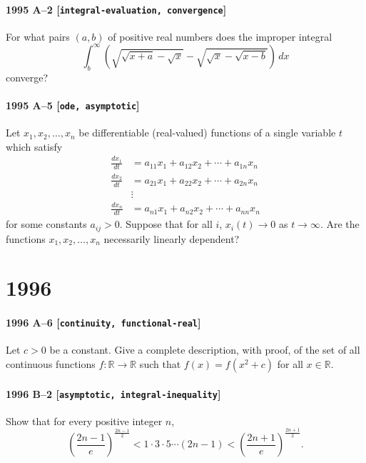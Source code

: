 \documentclass[11pt]{article}
\begin{document}
\paragraph{1995 A--2 \textnormal{[\texttt{integral-evaluation, convergence}]}}
For what pairs $(a,b)$ of positive real numbers does the
improper integral
\[
\int_{b}^{\infty} \left( \sqrt{\sqrt{x+a}-\sqrt{x}} -
\sqrt{\sqrt{x}-\sqrt{x-b}} \right)\,dx
\]
converge?

\paragraph{1995 A--5 \textnormal{[\texttt{ode, asymptotic}]}}
Let $x_{1},x_{2},\dots,x_{n}$ be differentiable
(real-valued) functions of a single variable $t$ which satisfy
\begin{align*}
\frac{dx_{1}}{dt} &= a_{11}x_{1} + a_{12}x_{2} + \cdots + a_{1n}x_{n} \\
\frac{dx_{2}}{dt} &= a_{21}x_{1} + a_{22}x_{2} + \cdots + a_{2n}x_{n} \\
&\vdots \\
\frac{dx_{n}}{dt} &= a_{n1}x_{1} + a_{n2}x_{2} + \cdots + a_{nn}x_{n}
\end{align*}
for some constants $a_{ij}>0$. Suppose that for all $i$, $x_{i}(t)
\to 0$ as $t \to \infty$. Are the functions $x_{1},x_{2},\dots,x_{n}$
necessarily linearly dependent?

\section*{1996}

\paragraph{1996 A--6 \textnormal{[\texttt{continuity, functional-real}]}}
Let $c>0$ be a constant. Give a complete description, with proof, of
the set of all continuous functions $f: \mathbb{R} \to \mathbb{R}$ such that $f(x) =
f(x^2+c)$ for all $x \in \mathbb{R}$.

\paragraph{1996 B--2 \textnormal{[\texttt{asymptotic, integral-inequality}]}}
Show that for every positive integer $n$,
\[
\left( \frac{2n-1}{e} \right)^{\frac{2n-1}{2}} < 1 \cdot 3 \cdot 5
\cdots (2n-1) < \left( \frac{2n+1}{e} \right)^{\frac{2n+1}{2}}.
\]
\end{document}
